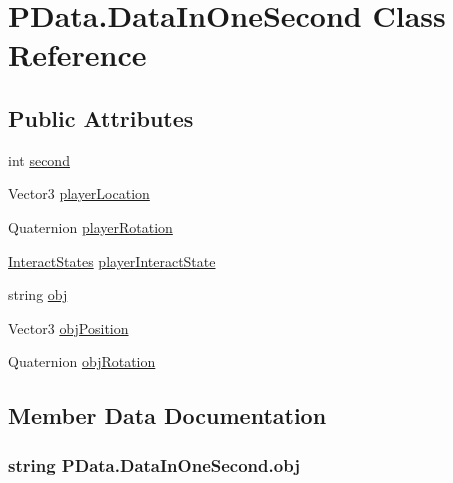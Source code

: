 \hypertarget{class_p_data_1_1_data_in_one_second}{}\section{P\+Data.\+Data\+In\+One\+Second Class Reference}
\label{class_p_data_1_1_data_in_one_second}
\subsection*{Public Attributes}
\begin{DoxyCompactItemize}
\item 
int \hyperlink{class_p_data_1_1_data_in_one_second_a22285d27875a943a8251a64f0cf10f82}{second}
\item 
Vector3 \hyperlink{class_p_data_1_1_data_in_one_second_a06829ae18e075bc35a063145cd84d38e}{player\+Location}
\item 
Quaternion \hyperlink{class_p_data_1_1_data_in_one_second_ac1604f4086193d1e50d1ab6e44d0d47f}{player\+Rotation}
\item 
\hyperlink{_interact_8cs_a09864dfb2acbb6d227a6c2f1b81e7d3d}{Interact\+States} \hyperlink{class_p_data_1_1_data_in_one_second_af7a6a9ca343f42471e0c927389abc7c6}{player\+Interact\+State}
\item 
string \hyperlink{class_p_data_1_1_data_in_one_second_a87127a811d8552fe06ddbbe80e70da4a}{obj}
\item 
Vector3 \hyperlink{class_p_data_1_1_data_in_one_second_ae44c6bf07156b834e5cabea37a339673}{obj\+Position}
\item 
Quaternion \hyperlink{class_p_data_1_1_data_in_one_second_a566a9d7ff4c089f79fca5acc5d656fd6}{obj\+Rotation}
\end{DoxyCompactItemize}


\subsection{Member Data Documentation}
\subsubsection[{\texorpdfstring{obj}{obj}}]{\setlength{\rightskip}{0pt plus 5cm}string P\+Data.\+Data\+In\+One\+Second.\+obj}\hypertarget{class_p_data_1_1_data_in_one_second_a87127a811d8552fe06ddbbe80e70da4a}{}\label{class_p_data_1_1_data_in_one_second_a87127a811d8552fe06ddbbe80e70da4a}
